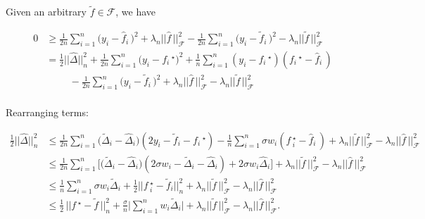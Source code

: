 \documentclass[11pt]{beamer}
\newcommand{\cF}{\mathcal{F}}
\newcommand{\fstar}{f\,^\star}
\newcommand{\fhat}{\widehat{f}}
\newcommand{\ftilde}{\widetilde{f}}
\newcommand{\Dhat}{\widehat{\Delta}}
\newcommand{\Dtilde}{\widetilde{\Delta}}
\begin{document}
	\begin{frame}
		\begin{small}
			 Given an arbitrary $\ftilde \in \cF$, we have 
			\begin{scriptsize}
				\begin{align*}
				0 &\geq \frac{1}{2n}\sum_{i = 1}^{n} \big(y_i - \fhat_i\,\big)^2 + \lambda_n ||\fhat\,||_\cF^2 - \frac{1}{2n}\sum_{i = 1}^{n} \big(y_i - \ftilde_i\,\big)^2 - \lambda_n ||\ftilde\,||_\cF^2  \\
				&= \frac{1}{2}||\Dhat||_n^2 +  \frac{1}{2n}\sum_{i = 1}^{n} \big( y_i - {f_i\,^\star}\big)^2 + \frac{1}{n}\sum_{i = 1}^{n} (y_i - f_i\,^\star)(f_i\,^\star - \fhat_i\,)\\
				&\hspace{1cm} - \frac{1}{2n}\sum_{i = 1}^{n} \big(y_i - \ftilde_i\,\big)^2 + \lambda_n ||\fhat\,||_\cF^2 - \lambda_n ||\ftilde\,||_\cF^2\\
				\end{align*}		
			\end{scriptsize}
				\vspace{-1cm}	
				
				
			 	Rearranging terms:
			 	\begin{scriptsize}
			\begin{align*}
				\frac{1}{2}||\Dhat||_n^2 &\leq \frac{1}{2n}\sum_{i = 1}^{n} \big(\Dtilde_i - \Dhat_i\big) (2y_i - \ftilde_i - f_i\,^\star) - \frac{1}{n}\sum_{i = 1}^{n}\sigma w_i (\fstar_i - \fhat_i\,) + \lambda_n ||\ftilde\,||_\cF^2 - \lambda_n ||\fhat\,||_\cF^2\\
				&\leq \frac{1}{2n}\sum_{i = 1}^{n}\Big[ \big(\Dtilde_i - \Dhat_i\big) (2\sigma w_i - \Dtilde_i - \Dhat_i) + 2\sigma w_i \Dhat_i\Big] + \lambda_n ||\ftilde\,||_\cF^2 - \lambda_n ||\fhat\,||_\cF^2 \\ 
				&\leq\frac{1}{n}\sum_{i = 1}^{n}\sigma w_i \Dtilde_i + \frac{1}{2} ||\fstar_i - \ftilde_i||_n^2 + \lambda_n ||\ftilde\,||_\cF^2 - \lambda_n ||\fhat\,||_\cF^2\\
				&\leq \frac{1}{2} \,||\fstar - \ftilde\,||_n^2 + \frac{\sigma}{n}\Big|\sum_{i = 1}^{n}w_i \Dtilde_i\Big|+ \lambda_n ||\ftilde\,||_\cF^2 - \lambda_n ||\fhat\,||_\cF^2.
				\end{align*}
			\end{scriptsize}			
			\end{small}
	\end{frame}
	
\end{document}
